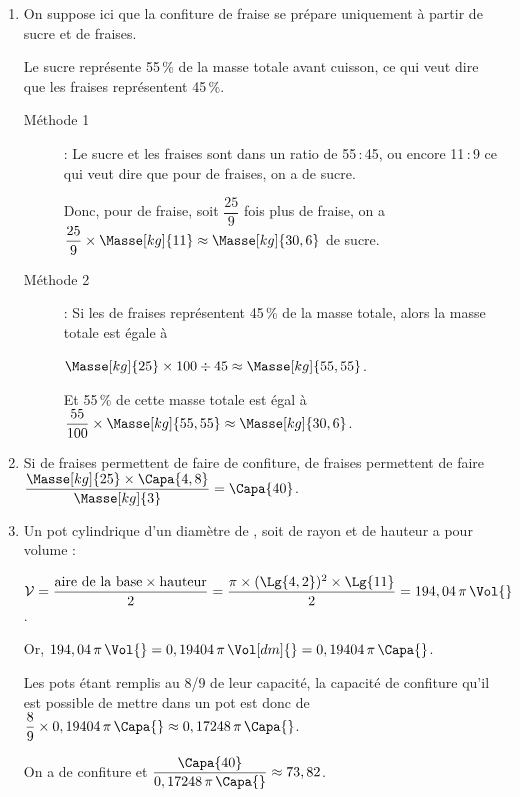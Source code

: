 \begin{enumerate}
   \item On suppose ici que la confiture de fraise se prépare uniquement à partir de sucre et de fraises. \par
      Le sucre représente 55\,\% de la masse totale avant cuisson, ce qui veut dire que les fraises représentent 45\,\%.
      \begin{description}
         \item[Méthode 1] : Le sucre et les fraises sont dans un ratio de 55\,:\,45, ou encore 11\,:\,9 ce qui veut dire que pour  de fraises, on a  de sucre. \par
            Donc, pour  de fraise, soit $\dfrac{25}{9}$ fois plus de fraise, on a $\dfrac{25}{9}\times\Masse[kg]{11} \approx\Masse[kg]{30,6}$ de sucre.
         \item[Méthode 2] : Si les  de fraises représentent 45\,\% de la masse totale, alors la masse totale est égale à \par
            $\Masse[kg]{25}\times100\div45 \approx\Masse[kg]{55,55}$. \par
            Et 55\,\% de cette masse totale est égal à $\dfrac{55}{100}\times\Masse[kg]{55,55} \approx\Masse[kg]{30,6}$.
      \end{description}
   \item Si  de fraises permettent de faire  de confiture,  de fraises permettent de faire $\dfrac{\Masse[kg]{25}\times\Capa{4,8}}{\Masse[kg]{3}} =\Capa{40}$. \par
   \item Un pot cylindrique d'un diamètre de , soit de rayon  et de hauteur  a pour volume  : \par
      $\mathcal{V} =\dfrac{\text{aire de la base}\times\text{hauteur}}{2} =\dfrac{\pi\times(\Lg{4,2})^2\times\Lg{11}}{2} =194,04\,\pi\,\Vol{}$. \par
      Or, $194,04\,\pi\,\Vol{} =0,19404\,\pi\,\Vol[dm]{} =0,19404\,\pi\,\Capa{}$. \par
      Les pots étant remplis au 8/9 de leur capacité, la capacité de confiture qu'il est possible de mettre dans un pot est donc de $\dfrac89\times0,19404\,\pi\,\Capa{} \approx0,17248\,\pi\,\Capa{}$. \par
      On a  de confiture et $\dfrac{\Capa{40}}{0,17248\,\pi\,\Capa{}} \approx73,82$. 
\end{enumerate}